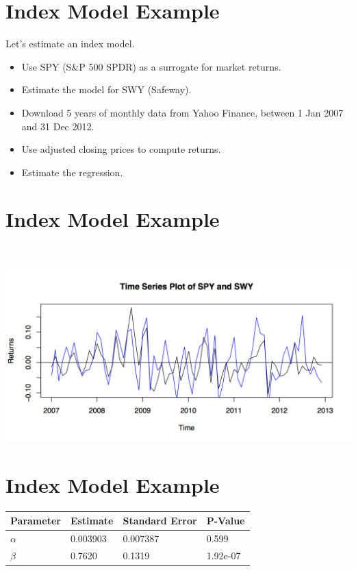 \documentclass[letterpaper,10pt,english]{sphinxmanual}
\begin{document}
\section{Index Model Example}
\label{indexModels:index-model-example}
Let's estimate an index model.
\begin{itemize}
\item {} 
Use SPY (S\&P 500 SPDR) as a surrogate for market returns.

\end{itemize}
\begin{itemize}
\item {} 
Estimate the model for SWY (Safeway).

\end{itemize}
\begin{itemize}
\item {} 
Download 5 years of monthly data from Yahoo Finance, between 1 Jan
2007 and 31 Dec 2012.

\end{itemize}
\begin{itemize}
\item {} 
Use adjusted closing prices to compute returns.

\end{itemize}
\begin{itemize}
\item {} 
Estimate the regression.

\end{itemize}


\section{Index Model Example}
\label{indexModels:id13}
$\qquad$

\includegraphics[width=6in]{spy-swy-tsplot.png}


\section{Index Model Example}
\label{indexModels:id14}
\begin{tabulary}{\linewidth}{|L|L|L|L|}
\hline
\textsf{\relax 
Parameter
} & \textsf{\relax 
Estimate
} & \textsf{\relax 
Standard Error
} & \textsf{\relax 
P-Value
}\\
\hline
$\alpha$
 & 
0.003903
 & 
0.007387
 & 
0.599
\\

$\beta$
 & 
0.7620
 & 
0.1319
 & 
1.92e-07
\\
\hline\end{tabulary}
\end{document}
